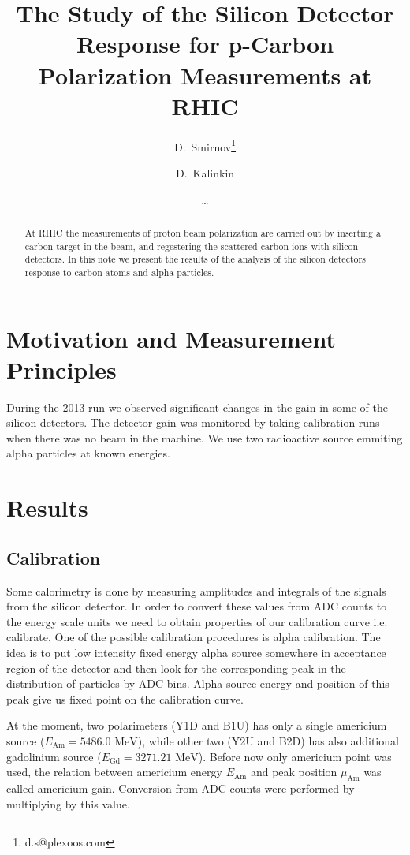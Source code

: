 \documentclass[a4paper,12pt]{article}
\title{The Study of the Silicon Detector Response for p-Carbon Polarization Measurements at RHIC}
\author[1]{D.~Smirnov\thanks{d.s@plexoos.com}}
\author[2]{D.~Kalinkin}
\author[]{\ldots}
\affil[1]{Brookhaven National Lab}
\affil[2]{ITEP}
\begin{document}
\maketitle

\begin{abstract}
At RHIC the measurements of proton beam polarization are carried out
by inserting a carbon target in the beam, and regestering the scattered carbon
ions with silicon detectors. In this note we present the results of the
analysis of the silicon detectors response to carbon atoms and alpha particles.
\end{abstract}

\section{Motivation and Measurement Principles}

During the 2013 run we observed significant changes in the gain in some of the
silicon detectors. The detector gain was monitored by taking calibration runs
when there was no beam in the machine. We use two radioactive source emmiting
alpha particles at known energies.

\section{Results}

\subsection{Calibration}

Some calorimetry is done by measuring amplitudes and integrals of the signals
from the silicon detector. In order to convert these values from ADC counts
to the energy scale units we need to obtain properties of our calibration
curve i.e. calibrate. One of the possible calibration procedures is alpha
calibration. The idea is to put low intensity fixed energy alpha source
somewhere in acceptance region of the detector and then look for the corresponding
peak in the distribution of particles by ADC bins. Alpha source energy and
position of this peak give us fixed point on the calibration curve.

At the moment, two polarimeters (Y1D and B1U) has only a single americium source
($E_{\text{Am}} = 5486.0\text{ MeV}$), while other two (Y2U and B2D) has also additional
gadolinium source ($E_{\text{Gd}} = 3271.21\text{ MeV}$). Before now only americium point was
used, the relation between americium energy $E_{\text{Am}}$ and peak position $\mu_{\text{Am}}$
was called americium gain. Conversion from ADC counts were performed by multiplying by this value.
\end{document}
